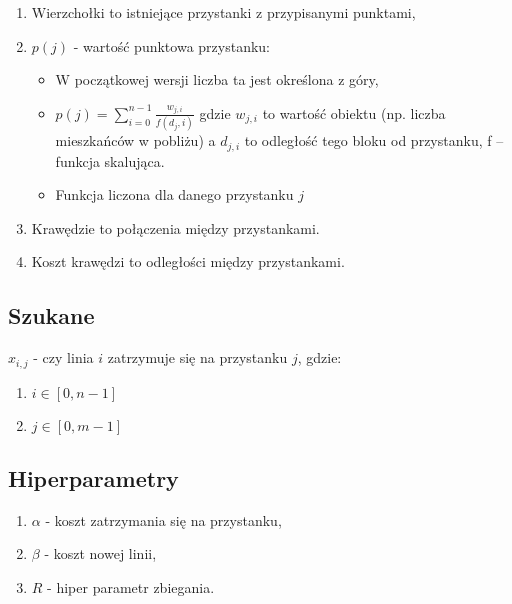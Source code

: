 \documentclass[12pt,a4paper,openright]{mwrep}
\begin{document}
\begin{enumerate}
    \item Wierzchołki to istniejące przystanki z przypisanymi punktami,
    \item $p(j)$ - wartość punktowa przystanku:
          \begin{itemize}
              \item  W początkowej wersji liczba ta jest określona z góry,
              \item $p(j) = \sum_{i=0}^{n-1} \frac{w_{j, i}}{f(d_j, i)}$ gdzie $w_{j, i}$ to wartość obiektu (np. liczba mieszkańców w pobliżu) a $d_{j,i}$ to odległość tego bloku od przystanku, f – funkcja skalująca.
              \item Funkcja liczona dla danego przystanku $j$
          \end{itemize}
    \item Krawędzie to połączenia między przystankami.
    \item Koszt krawędzi to odległości między przystankami.
\end{enumerate}










\subsection{Szukane}
$x_{i,j}$ - czy linia $i$ zatrzymuje się na przystanku $j$, gdzie:
\begin{enumerate}
    \item $i \in \left[ 0, n-1 \right]$
    \item $j \in \left[ 0, m-1 \right]$
\end{enumerate}

\subsection{Hiperparametry}
\begin{enumerate}
    \item $\alpha$ - koszt zatrzymania się na przystanku,
    \item $\beta$ - koszt nowej linii,
    \item $R$ - hiper parametr zbiegania.
\end{enumerate}
\end{document}
